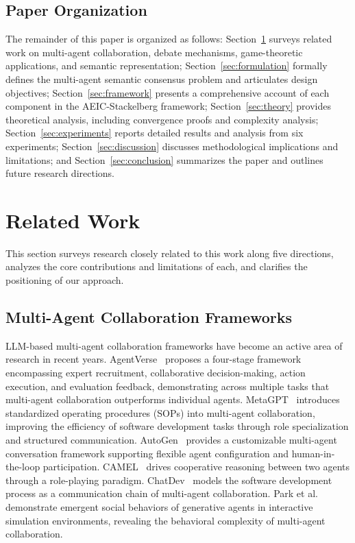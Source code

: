 \documentclass[12pt,a4paper]{article}
\begin{document}
\subsection{Paper Organization}

The remainder of this paper is organized as follows: Section~\ref{sec:related} surveys related work on multi-agent collaboration, debate mechanisms, game-theoretic applications, and semantic representation; Section~\ref{sec:formulation} formally defines the multi-agent semantic consensus problem and articulates design objectives; Section~\ref{sec:framework} presents a comprehensive account of each component in the AEIC-Stackelberg framework; Section~\ref{sec:theory} provides theoretical analysis, including convergence proofs and complexity analysis; Section~\ref{sec:experiments} reports detailed results and analysis from six experiments; Section~\ref{sec:discussion} discusses methodological implications and limitations; and Section~\ref{sec:conclusion} summarizes the paper and outlines future research directions.

\section{Related Work}\label{sec:related}

This section surveys research closely related to this work along five directions, analyzes the core contributions and limitations of each, and clarifies the positioning of our approach.

\subsection{Multi-Agent Collaboration Frameworks}

LLM-based multi-agent collaboration frameworks have become an active area of research in recent years. AgentVerse~\cite{chen2023agentverse} proposes a four-stage framework encompassing expert recruitment, collaborative decision-making, action execution, and evaluation feedback, demonstrating across multiple tasks that multi-agent collaboration outperforms individual agents. MetaGPT~\cite{hong2023metagpt} introduces standardized operating procedures (SOPs) into multi-agent collaboration, improving the efficiency of software development tasks through role specialization and structured communication. AutoGen~\cite{wu2023autogen} provides a customizable multi-agent conversation framework supporting flexible agent configuration and human-in-the-loop participation. CAMEL~\cite{li2023camel} drives cooperative reasoning between two agents through a role-playing paradigm. ChatDev~\cite{qian2023chatdev} models the software development process as a communication chain of multi-agent collaboration. Park et al.~\cite{park2023generative} demonstrate emergent social behaviors of generative agents in interactive simulation environments, revealing the behavioral complexity of multi-agent collaboration.
\end{document}

